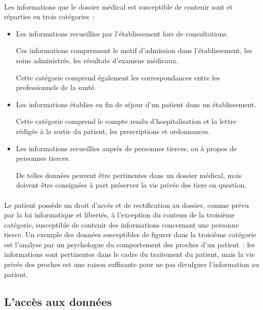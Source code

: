 \paragraph{}
Les informations que le dossier médical est susceptible de contenir sont et
réparties en trois catégories~:

\begin{itemize}
    \item Les informations recueillies par l'établissement lors de
        consultations.

        Ces informations comprennent le motif d'admission dans l'établissement,
        les soins administrés, les résultats d'examens médicaux.

        Cette catégorie comprend également les correspondances entre les
        professionnels de la santé.

    \item Les informations établies en fin de séjour d'un patient dans un
        établissement.

        Cette catégorie comprend le compte rendu d'hospitalisation et la lettre
        rédigée à la sortie du patient, les prescriptions et ordonnances.

    \item Les informations recueillies auprès de personnes tierces, ou à propos
        de personnes tierces.

        De telles données peuvent être pertinentes dans un dossier médical,
        mais doivent être consignées à part préserver la vie privée des tiers
        en question.
\end{itemize}

\paragraph{}
Le patient possède un droit d'accès et de rectification au dossier, comme prévu
par la loi informatique et libertés, à l'exception du contenu de la troisième
catégorie, susceptible de contenir des informations concernant une personne
tierce. Un exemple des données susceptibles de figurer dans la troisième
catégorie est l'analyse par un psychologue du comportement des proches d'un
patient~: les informations sont pertinentes dans le cadre du traitement du
patient, mais la vie privée des proches est une raison suffisante pour ne pas
divulguer l'information au patient.


        \subsection{L'accès aux données}

